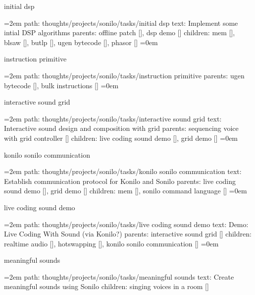 \bigskip
{}
initial dsp
\smallskip
\par\begingroup
\leftskip=2em
path: thoughts/projects/sonilo/tasks/initial dsp
\smallskip
text:  Implement some intial DSP algorithms
\smallskip
parents:  offline patch [], dsp demo []
\smallskip
children: mem [], blsaw [], butlp [], ugen bytecode [], phasor []
\smallskip
\leftskip=0em
\par\endgroup
\bigskip
{}
instruction primitive
\smallskip
\par\begingroup
\leftskip=2em
path: thoughts/projects/sonilo/tasks/instruction primitive
\smallskip
parents:  ugen bytecode [], bulk instructions []
\smallskip
\leftskip=0em
\par\endgroup
\bigskip
{}
interactive sound grid
\smallskip
\par\begingroup
\leftskip=2em
path: thoughts/projects/sonilo/tasks/interactive sound grid
\smallskip
text:  Interactive sound design and composition with grid
\smallskip
parents:  sequencing voice with grid controller []
\smallskip
children: live coding sound demo [], grid demo []
\smallskip
\leftskip=0em
\par\endgroup
\bigskip
{}
konilo sonilo communication
\smallskip
\par\begingroup
\leftskip=2em
path: thoughts/projects/sonilo/tasks/konilo sonilo communication
\smallskip
text:  Establish communication protocol for Konilo and Sonilo
\smallskip
parents:  live coding sound demo [], grid demo []
\smallskip
children: mem [], sonilo command language []
\smallskip
\leftskip=0em
\par\endgroup
\bigskip
{}
live coding sound demo
\smallskip
\par\begingroup
\leftskip=2em
path: thoughts/projects/sonilo/tasks/live coding sound demo
\smallskip
text:  Demo: Live Coding With Sound (via Konilo?)
\smallskip
parents:  interactive sound grid []
\smallskip
children: realtime audio [], hotswapping [], konilo sonilo communication []
\smallskip
\leftskip=0em
\par\endgroup
\bigskip
{}
meaningful sounds
\smallskip
\par\begingroup
\leftskip=2em
path: thoughts/projects/sonilo/tasks/meaningful sounds
\smallskip
text:  Create meaningful sounds using Sonilo
\smallskip
children: singing voices in a room []
